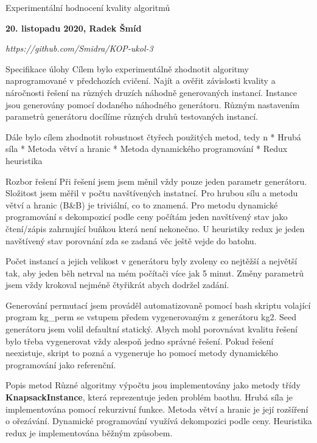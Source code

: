 

\tit Experimentální hodnocení kvality algoritmů
\centerline{\bf 20. listopadu 2020, Radek Šmíd}
\medskip
\centerline{\it https://github.com/Smidra/KOP-ukol-3}


\sec Specifikace úlohy
Cílem bylo experimentálně zhodnotit algoritmy naprogramované v předchozích cvičení. Najít a ověřit závislosti kvality a náročnosti řešení na různých druzích náhodně generovaných instancí. Instance jsou generovány pomocí dodaného náhodného generátoru. Různým nastavením parametrů generátoru docílíme různých druhů testovaných instancí.

Dále bylo cílem zhodnotit robustnost čtyřech použitých metod, tedy
\begitems\style n
* Hrubá síla
* Metoda větví a hranic
* Metoda dynamického programování
* Redux heuristika
\enditems



\sec Rozbor řešení
Při řešení jsem jsem měnil vždy pouze jeden parametr generátoru. Složitost jsem měřil v počtu navštíve\-ných instatncí. Pro hrubou sílu a metodu větví a hranic (B\&B) je triviální, co to znamená. Pro metodu dynamické programování s dekompozicí podle ceny počítám jeden navštívený stav jako čtení/zápis zahrnující buňkou která není nekonečno. U heuristiky redux je jeden navštívený stav porovnání zda se zadaná věc ještě vejde do batohu.

Počet instancí a jejich velikost v generátoru byly zvoleny co nejtěžší a největší tak, aby jeden běh netrval na mém počítači více jak 5 minut. Změny parametrů jsem vždy krokoval nejméně čtyřikrát abych dodržel zadání.

Generování permutací jsem prováděl automatizovaně pomocí bash skriptu volající program kg\_perm se vstupem předem vygenerovaným z generátoru kg2. Seed generátoru jsem volil defaultní statický. Abych mohl porovnávat kvalitu řešení bylo třeba vygenerovat vždy alespoň jedno správné řešení. Pokud řešení neexistuje, skript to pozná a vygeneruje ho pomocí metody dynamického programování jako referenční.

\secc Popis metod
Různé algoritmy výpočtu jsou implementovány jako metody třídy {\bf KnapsackInstance}, která reprezentuje jeden problém baothu. Hrubá síla je implementována pomocí rekurzivní funkce. Metoda větví a hranic je její rozšíření o ořezávání. Dynamické programování využívá dekompozici podle ceny. Heuristika redux je implementována běžným způsobem.



